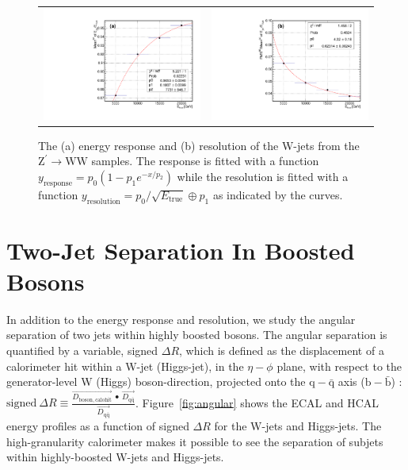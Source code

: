 \documentclass{PoS}
\begin{document}
\begin{figure}
\begin{center}
\begin{tabular}{cc}
\includegraphics[width=.4\textwidth]{figs/Mean90Fit.pdf} &
\includegraphics[width=.4\textwidth]{figs/RMS90Fit.pdf} \\
\end{tabular}
\end{center}
\caption{The (a) energy response and (b) resolution of the W-jets from the 
$\mathrm{Z}^{\prime}\rightarrow \mathrm{WW}$ samples. The response is fitted 
with a function $y_\mathrm{response} = p_0\left(1-p_1 e^{-x/p_2}\right)$ 
while the resolution is fitted with a function 
$y_\mathrm{resolution}=p_0/\sqrt{E_\mathrm{true}}\oplus p_1$ as indicated 
by the curves.}
\label{fig:wjet}
\end{figure}

\section{Two-Jet Separation In Boosted Bosons \label{sec:angular}}
In addition to the energy response and resolution, we study the angular 
separation of two jets within highly boosted bosons. The angular separation 
is quantified by a variable, signed $\Delta R$, which is defined as the 
displacement of a calorimeter hit within a W-jet (Higgs-jet), in the 
$\eta-\phi$ plane, with respect to the generator-level W (Higgs) boson-direction, projected onto the $\mathrm{q}-\bar{\mathrm{q}}$ 
axis ($\mathrm{b}-\bar{\mathrm{b}}$) : \( \mathrm{signed}~\Delta R \equiv 
\frac{\overrightarrow{D_{\mathrm{boson,calohit}}}~\bullet~\overrightarrow{D_{\mathrm{q}\bar{\mathrm{q}}}}}{\overrightarrow{D_{\mathrm{q}\bar{\mathrm{q}}}}}\). 
Figure~\ref{fig:angular} shows the ECAL and HCAL energy profiles as a function 
of signed $\Delta R$ for the W-jets and Higgs-jets. The high-granularity 
calorimeter makes it possible to see the separation of subjets within 
highly-boosted W-jets and Higgs-jets.
\end{document}
